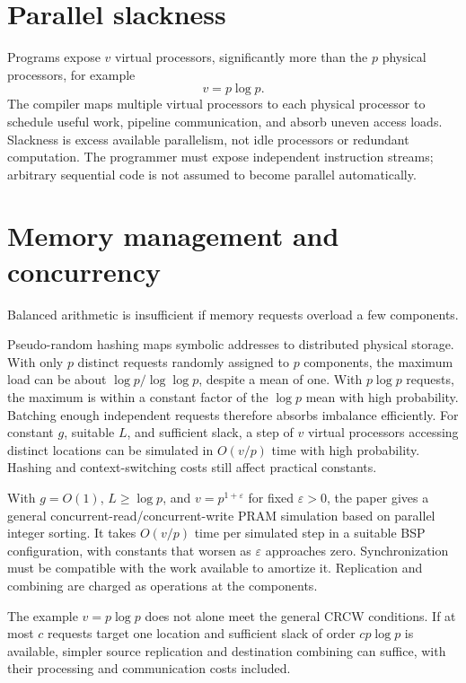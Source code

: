 \documentclass[11pt,a4paper]{article}
\newcommand{\topic}[1]{\section*{#1}}
\begin{document}
\topic{Parallel slackness}
Programs expose $v$ virtual processors, significantly more than the $p$
physical processors, for example
\[
  v = p\log p.
\]
The compiler maps multiple virtual processors to each physical processor
to schedule useful work, pipeline communication, and absorb uneven access
loads. Slackness is excess available parallelism, not idle processors or
redundant computation. The programmer must expose independent instruction
streams; arbitrary sequential code is not assumed to become parallel automatically.

\newpage
\topic{Memory management and concurrency}
Balanced arithmetic is insufficient if memory requests overload a few components.

\begin{description}[style=nextline]
  \item[Hashing for automatic allocation.]
  Pseudo-random hashing maps symbolic addresses to distributed physical
  storage. With only $p$ distinct requests randomly assigned to $p$ components,
  the maximum load can be about $\log p/\log\log p$, despite a mean of one.
  With $p\log p$ requests, the maximum is within a constant factor of the
  $\log p$ mean with high probability. Batching enough independent requests
  therefore absorbs imbalance efficiently. For constant $g$, suitable $L$,
  and sufficient slack, a step of $v$ virtual processors accessing distinct
  locations can be simulated in $O(v/p)$ time with high probability.
  Hashing and context-switching costs still affect practical constants.

  \item[Simultaneous accesses (CRCW PRAM).]
  With $g=O(1)$, $L\geq\log p$, and $v=p^{1+\varepsilon}$ for fixed
  $\varepsilon>0$, the paper gives a general concurrent-read/concurrent-write
  PRAM simulation based on parallel integer sorting. It takes $O(v/p)$ time
  per simulated step in a suitable BSP configuration, with constants that
  worsen as $\varepsilon$ approaches zero. Synchronization must be compatible
  with the work available to amortize it. Replication and combining are
  charged as operations at the components.
\end{description}

The example $v=p\log p$ does not alone meet the general CRCW conditions.
If at most $c$ requests target one location and sufficient slack of order
$cp\log p$ is available, simpler source replication and destination combining
can suffice, with their processing and communication costs included.
\end{document}
